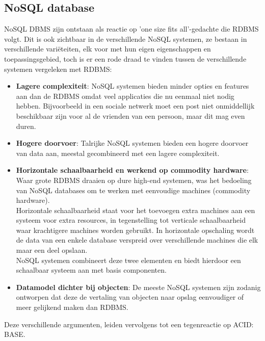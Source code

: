 \subsection{NoSQL database}
NoSQL DBMS zijn ontstaan als reactie op 'one size fits all'-gedachte die RDBMS volgt. Dit is ook zichtbaar in de verschillende NoSQL systemen, ze bestaan in verschillende variëteiten, elk voor met hun eigen eigenschappen en toepassingsgebied, toch is er een rode draad te vinden tussen de verschillende systemen vergeleken met RDBMS: 
\begin{itemize}
	\item \textbf{Lagere complexiteit}: NoSQL systemen bieden minder opties en features aan dan de RDBMS omdat veel applicaties die nu eenmaal niet nodig hebben. Bijvoorbeeld in een sociale netwerk moet een post niet onmiddellijk beschikbaar zijn voor al de vrienden van een persoon, maar dit mag even duren.
	\item \textbf{Hogere doorvoer}: Talrijke NoSQL systemen bieden een hogere doorvoer van data aan, meestal gecombineerd met een lagere complexiteit. 
	\item \textbf{Horizontale schaalbaarheid en werkend op commodity hardware}: Waar grote RDBMS draaien op dure high-end systemen, was het bedoeling van NoSQL databases om te werken met eenvoudige machines (commodity hardware). \\
	Horizontale schaalbaarheid staat voor het toevoegen extra machines aan een systeem voor extra resources, in tegenstelling tot verticale schaalbaarheid waar krachtigere machines worden gebruikt. In horizontale opschaling wordt de data van een enkele database verspreid over verschillende machines die elk maar een deel opslaan.\\
	NoSQL systemen combineert deze twee elementen en biedt hierdoor een schaalbaar systeem aan met basis componenten.
	\item \textbf{Datamodel dichter bij objecten}: De meeste NoSQL systemen zijn zodanig ontworpen dat deze de vertaling van objecten naar opslag eenvoudiger of meer gelijkend maken dan RDBMS.  
\end{itemize}  \noindent
Deze verschillende argumenten, leiden vervolgens tot een tegenreactie op ACID: BASE. \noindent
